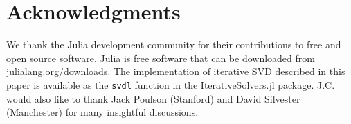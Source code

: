 \documentclass[review]{siamart0516}
\begin{document}
\section*{Acknowledgments}

We thank the Julia development community for their contributions to free and
open source software. Julia is free software that can be downloaded from
\url{julialang.org/downloads}. The implementation of iterative SVD described in
this paper is available as the \verb|svdl| function in the
\href{https://github.com/JuliaLang/IterativeSolvers.jl}{IterativeSolvers.jl}
package. J.C. would also like to thank Jack Poulson (Stanford) and David Silvester
(Manchester) for many insightful discussions.


\end{document}
